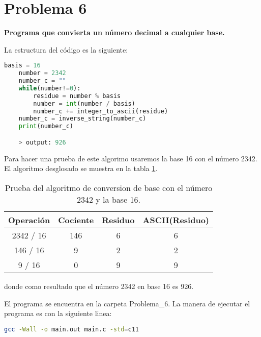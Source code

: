 \section*{Problema 6}
\textbf{Programa que convierta un número decimal a cualquier base.}

La estructura del código es la siguiente:
\begin{lstlisting}[language=python]
    basis = 16
    number = 2342
    number_c = ""
    while(number!=0):
        residue = number % basis
        number = int(number / basis)
        number_c += integer_to_ascii(residue)
    number_c = inverse_string(number_c)
    print(number_c)

    > output: 926
\end{lstlisting}

Para hacer una prueba de este algorimo usaremos la base 16 con el número 2342. El algoritmo desglosado se muestra en la tabla \ref{table:test_problem6}.
\begin{table}[H]
    \centering
    \begin{tabular}{cccc} \hline
        \textbf{Operación} & \textbf{Cociente} & \textbf{Residuo} & \textbf{ASCII(Residuo)} \\ \hline
        2342 / 16          & 146               & 6                & 6                       \\
        146 / 16           & 9                 & 2                & 2                       \\
        9 / 16             & 0                 & 9                & 9                       \\\hline
    \end{tabular}
    \caption{Prueba del algoritmo de conversion de base con el número 2342 y la base 16.}
    \label{table:test_problem6}
\end{table}
donde como resultado que el número 2342 en base 16 es 926.

El programa se encuentra en la carpeta \textcolor{citecolor}{Problema\_6}. La manera de ejecutar el programa es con la siguiente linea:
\begin{lstlisting}[language=bash]
    gcc -Wall -o main.out main.c -std=c11
\end{lstlisting}
